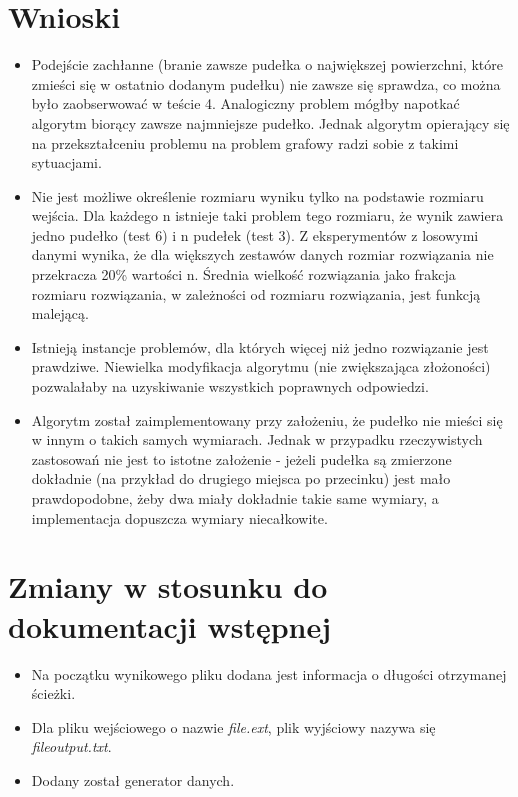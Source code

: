 \documentclass{article}
\begin{document}
\section{Wnioski}
\begin{itemize}
\item Podejście zachłanne (branie zawsze pudełka o największej powierzchni, które zmieści się w ostatnio dodanym pudełku) nie zawsze się sprawdza, co można było zaobserwować w teście 4. Analogiczny problem mógłby napotkać algorytm biorący zawsze najmniejsze pudełko. Jednak algorytm opierający się na przekształceniu problemu na problem grafowy radzi sobie z takimi sytuacjami.
\item Nie jest możliwe określenie rozmiaru wyniku tylko na podstawie rozmiaru wejścia. Dla każdego n istnieje taki problem tego rozmiaru, że wynik zawiera jedno pudełko (test 6) i n pudełek (test 3). Z eksperymentów z losowymi danymi wynika, że dla większych zestawów danych rozmiar rozwiązania nie przekracza 20\% wartości n. Średnia wielkość rozwiązania jako frakcja rozmiaru rozwiązania, w zależności od rozmiaru rozwiązania, jest funkcją malejącą.
\item Istnieją instancje problemów, dla których więcej niż jedno rozwiązanie jest prawdziwe. Niewielka modyfikacja algorytmu (nie zwiększająca złożoności) pozwalałaby na uzyskiwanie wszystkich poprawnych odpowiedzi.
\item Algorytm został zaimplementowany przy założeniu, że pudełko nie mieści się w innym o takich samych wymiarach. Jednak w przypadku rzeczywistych zastosowań nie jest to istotne założenie - jeżeli pudełka są zmierzone dokładnie (na przykład do drugiego miejsca po przecinku) jest mało prawdopodobne, żeby dwa miały dokładnie takie same wymiary, a implementacja dopuszcza wymiary niecałkowite. 
\end{itemize}

\section{Zmiany w stosunku do dokumentacji wstępnej}
\begin{itemize}
\item Na początku wynikowego pliku dodana jest informacja o długości otrzymanej ścieżki.
\item Dla pliku wejściowego o nazwie \textit{file.ext}, plik wyjściowy nazywa się \textit{file\textunderscore output.txt}.
\item Dodany został generator danych.
\end{itemize}
\end{document}
